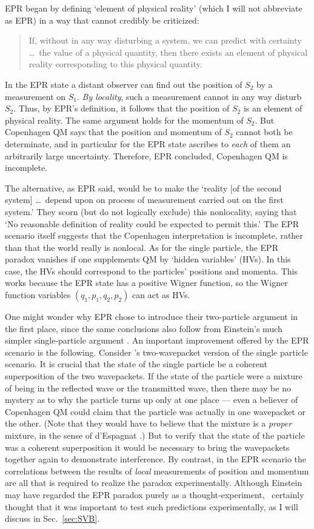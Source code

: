 \documentclass[12pt]{iopart}
\begin{document}
 EPR began by defining `element of physical reality'   (which I will not abbreviate as EPR)
in a way that cannot credibly be criticized: 
\begin{quote}
If, without in any way disturbing a system, we can predict with certainty \ldots\ the value of a physical quantity, then there exists an element of physical reality corresponding to this physical quantity.
\end{quote}
 In the EPR state a distant observer can find out the position of $S_2$ by a measurement on $S_1$. {\em By locality}, such a measurement cannot in any way disturb $S_2$. Thus, by EPR's definition, it follows that the position of $S_2$ is an element of physical reality. The same argument holds for the momentum of $S_2$.   But Copenhagen QM says that the position and momentum of $S_2$ cannot both be determinate, and in particular for the EPR state ascribes to {\em each} of them an arbitrarily large uncertainty. Therefore, EPR concluded, Copenhagen QM is incomplete.  

The alternative, as EPR said, would be to make the `reality [of the second system] \ldots\ depend upon on process of measurement carried out on the first system.' They scorn (but do not logically exclude) this nonlocality, saying that `No reasonable definition of reality could be expected to permit this.'  The EPR scenario itself suggests that the Copenhagen interpretation is incomplete, rather than that the world really is nonlocal. As for the single particle, the EPR paradox vanishes if one supplements QM by  `hidden variables' (HVs). In this case, the HVs should  correspond to the particles' positions and momenta. This works because the EPR state has a positive Wigner function, so the Wigner function variables $(q_1,p_1,q_2,p_2)$ can act as HVs.
 
 One might wonder why EPR chose to introduce their two-particle argument in the first place, since the same conclusions also follow from Einstein's much simpler single-particle argument  \cite{Nor05}. An important improvement offered by the EPR scenario is the following. Consider \hei's two-wavepacket version of the single particle scenario. It is crucial that the state of the single particle be a coherent superposition of the   two wavepackets. If the state of the particle were a mixture of being  in the reflected wave or the transmitted wave, then there may be no mystery as to why the particle turns up only at one place --- even a believer of Copenhagen QM could claim that the particle was actually in one wavepacket or the other. 
 (Note that they would have to believe that the mixture is a {\em proper} mixture, in the sense of d'Espagnat \cite{dEs89}.)  But to verify that the state of the particle was a coherent superposition it would be necessary to bring the wavepackets together again to demonstrate interference. By contrast, in the EPR scenario the correlations between the results of {\em local} measurements of position and momentum \cite{Rei89} are all that is required to realize the paradox experimentally. Although Einstein may have regarded the EPR paradox purely as a thought-experiment, \sch\ certainly thought that it was important to test such predictions experimentally, as I will discuss in Sec.~\ref{sec:SVB}. 
 
\end{document}
